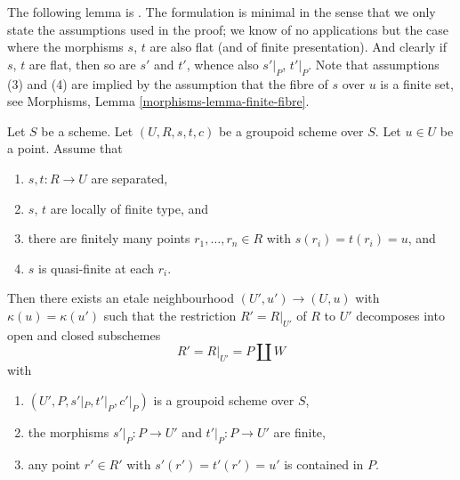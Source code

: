 \noindent
The following lemma is \cite[Proposition 4.2]{K-M}.
The formulation is minimal in the sense that we only state the assumptions
used in the proof; we know of no applications but the case where
the morphisms $s$, $t$ are also flat (and of finite presentation).
And clearly if $s$, $t$ are flat, then so are $s'$ and $t'$, whence
also $s'|_P$, $t'|_P$.
Note that assumptions (3) and (4) are implied by the assumption
that the fibre of $s$ over $u$ is a finite set, see
Morphisms, Lemma \ref{morphisms-lemma-finite-fibre}.

\begin{lemma}
\label{lemma-quasi-finite-groupoid}
Let $S$ be a scheme.
Let $(U, R, s, t, c)$ be a groupoid scheme over $S$.
Let $u \in U$ be a point. Assume that
\begin{enumerate}
\item $s, t : R \to U$ are separated,
\item $s$, $t$ are locally of finite type, and
\item there are finitely many points $r_1, \ldots, r_n \in R$ with
$s(r_i) = t(r_i) = u$, and
\item $s$ is quasi-finite at each $r_i$.
\end{enumerate}
Then there exists an etale neighbourhood $(U', u') \to (U, u)$
with $\kappa(u) = \kappa(u')$
such that the restriction $R' = R|_{U'}$ of $R$ to $U'$ decomposes
into open and closed subschemes
$$
R' = R|_{U'} = P \coprod W
$$
with
\begin{enumerate}
\item $(U', P, s'|_P, t'|_P, c'|_P)$ is a groupoid scheme over $S$,
\item the morphisms $s'|_P : P \to U'$ and $t'|_P : P \to U'$ are
finite,
\item any point $r' \in R'$ with $s'(r') = t'(r') = u'$ is contained
in $P$.
\end{enumerate}
\end{lemma}

